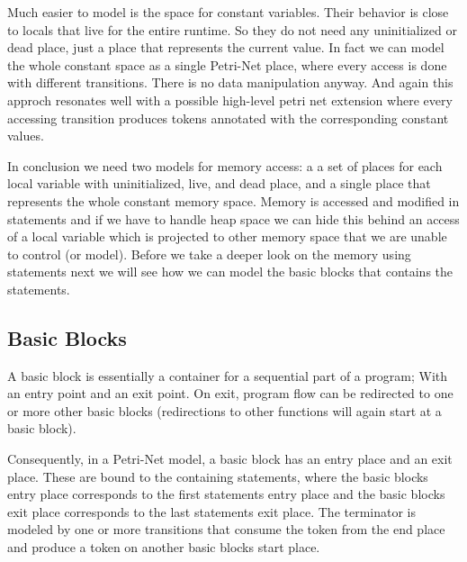 Much easier to model is the space for constant variables.
Their behavior is close to locals that live for the entire runtime.
So they do not need any uninitialized or dead place, just a place that represents the current value.
In fact we can model the whole constant space as a single Petri-Net place, where every access is done with different transitions.
There is no data manipulation anyway.
And again this approch resonates well with a possible high-level petri net extension where every accessing transition produces tokens annotated with the corresponding constant values.

In conclusion we need two models for memory access: a a set of places for each local variable with uninitialized, live, and dead place, and a single place that represents the whole constant memory space.
Memory is accessed and modified in statements and if we have to handle heap space we can hide this behind an access of a local variable which is projected to other memory space that we are unable to control (or model).
Before we take a deeper look on the memory using statements next we will see how we can model the basic blocks that contains the statements.

\subsection{Basic Blocks}
A basic block is essentially a container for a sequential part of a program; 
With an entry point and an exit point.
On exit, program flow can be redirected to one or more other basic blocks (redirections to other functions will again start at a basic block).

Consequently, in a Petri-Net model, a basic block has an entry place and an exit place.
These are bound to the containing statements, where the basic blocks entry place corresponds to the first statements entry place and the basic blocks exit place corresponds to the last statements exit place.
The terminator is modeled by one or more transitions that consume the token from the end place and produce a token on another basic blocks start place.


